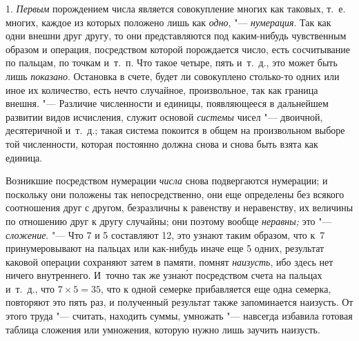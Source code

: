 1. {\em Первым} порождением числа является совокупление многих как таковых, т.~е.
многих, каждое из которых положено лишь как {\em одно}, "--- {\em нумерация}.
Так как одни внешни друг другу, то они представляются под каким-нибудь
чувственным образом и операция, посредством которой порождается число, есть
сосчитывание по пальцам, по точкам и~т.~п. Что такое четыре, пять и~т.~д., это
может быть лишь {\em показано}. Остановка в счете, будет ли совокуплено
столько-то одних или иное их количество, есть нечто случайное, произвольное,
так как граница внешня. "--- Различие численности и единицы, появляющееся в
дальнейшем развитии видов исчисления, служит основой {\em системы} чисел "---
двоичной, десятеричной и~т.~д.; такая система покоится в общем на произвольном
выборе той численности, которая постоянно должна снова и снова быть взята как
единица.

Возникшие посредством нумерации {\em числа} снова подвергаются нумерации; и
поскольку они положены так непосредственно, они еще определены без всякого
соотношения друг с другом, безразличны к равенству и неравенству, их величины
по отношению друг к другу случайны; они поэтому вообще {\em неравны;} это "---
{\em сложение}. "--- Что 7 и 5 составляют 12, это узнают таким образом, что к~7
принумеровывают на пальцах или как-нибудь иначе еще 5 одних, результат каковой
операции сохраняют затем в памяти, помнят {\em наизусть}, ибо здесь нет ничего
внутреннего. И~точно так же узна\'{ю}т посредством счета на пальцах и~т.~д.,
что $7\times 5=35$, что к одной семерке прибавляется еще одна семерка,
повторяют это пять раз, и полученный результат также запоминается наизусть. От
этого труда "--- считать, находить суммы, умножать "--- навсегда избавила
готовая таблица сложения или умножения, которую нужно лишь заучить наизусть.

